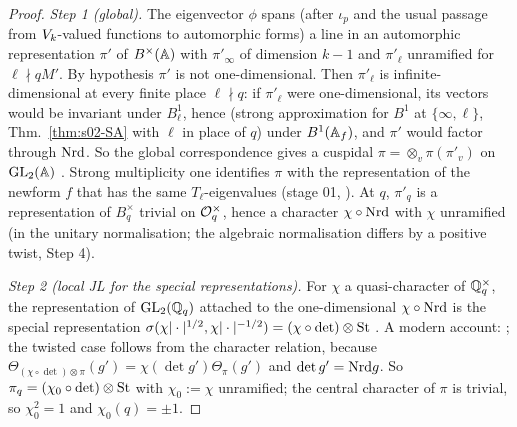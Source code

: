 \begin{proof}
\emph{Step 1 (global).} The eigenvector $\phi$ spans (after $\iota_p$ and the usual passage from $V_k$-valued functions to
automorphic forms) a line in an automorphic representation $\pi'$ of $B^\times(\mathbb{A})$ with $\pi'_\infty$ of dimension $k-1$ and
$\pi'_\ell$ unramified for $\ell\nmid qM'$. By hypothesis $\pi'$ is not one-dimensional. Then $\pi'_\ell$ is infinite-dimensional at every finite place $\ell\nmid q$:
if $\pi'_\ell$ were one-dimensional, its vectors would be invariant under $B_\ell^1$, hence (strong approximation for $B^1$ at
$\{\infty,\ell\}$, Thm.~\ref{thm:s02-SA} with $\ell$ in place of $q$) under $B^1(\mathbb{A}_f)$, and $\pi'$ would factor through $\mathrm{Nrd}$.
So the global correspondence gives a cuspidal $\pi=\otimes_v\pi(\pi'_v)$ on $\mathrm{GL}_2(\mathbb{A})$
\stcited{} . Strong multiplicity one identifies $\pi$
with the representation of the newform $f$ that has the same $T_\ell$-eigenvalues (stage 01, ).
At $q$, $\pi'_q$ is a representation of $B_q^\times$ trivial on $\mathcal{O}_q^\times$, hence a character $\chi\circ\mathrm{Nrd}$ with $\chi$
unramified (in the unitary normalisation; the algebraic normalisation differs by a positive twist, Step 4).

\emph{Step 2 (local JL for the special representations).} For $\chi$ a quasi-character of $\mathbb{Q}_q^\times$, the representation of
$\mathrm{GL}_2(\mathbb{Q}_q)$ attached to the one-dimensional $\chi\circ\mathrm{Nrd}$ is the special representation $\sigma(\chi|\cdot|^{1/2},\chi|\cdot|^{-1/2})
=(\chi\circ\det)\otimes\mathrm{St}$ \stcited{} . A modern account:
; the twisted case follows from the character relation, because $\Theta_{(\chi\circ\det)\otimes\pi}
(g')=\chi(\det g')\Theta_\pi(g')$ and $\det g'=\mathrm{Nrd} g$. So $\pi_q=(\chi_0\circ\det)\otimes\mathrm{St}$ with $\chi_0:=\chi$ unramified;
the central character of $\pi$ is trivial, so $\chi_0^2=1$ and $\chi_0(q)=\pm1$.


\end{proof}
